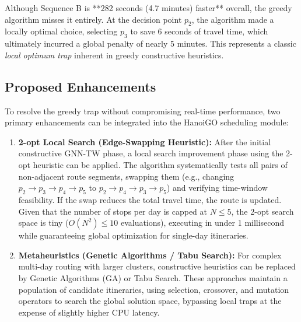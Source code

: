 Although Sequence B is **282 seconds (4.7 minutes) faster** overall, the greedy algorithm misses it entirely. At the decision point $p_2$, the algorithm made a locally optimal choice, selecting $p_3$ to save 6 seconds of travel time, which ultimately incurred a global penalty of nearly 5 minutes. This represents a classic \textit{local optimum trap} inherent in greedy constructive heuristics.

\subsection{Proposed Enhancements}

To resolve the greedy trap without compromising real-time performance, two primary enhancements can be integrated into the HanoiGO scheduling module:

\begin{enumerate}
    \item \textbf{2-opt Local Search (Edge-Swapping Heuristic):} 
    After the initial constructive GNN-TW phase, a local search improvement phase using the 2-opt heuristic can be applied. The algorithm systematically tests all pairs of non-adjacent route segments, swapping them (e.g., changing $p_2 \to p_3 \to p_4 \to p_5$ to $p_2 \to p_4 \to p_3 \to p_5$) and verifying time-window feasibility. If the swap reduces the total travel time, the route is updated. Given that the number of stops per day is capped at $N \le 5$, the 2-opt search space is tiny ($O(N^2) \le 10$ evaluations), executing in under 1 millisecond while guaranteeing global optimization for single-day itineraries.
    
    \item \textbf{Metaheuristics (Genetic Algorithms / Tabu Search):}
    For complex multi-day routing with larger clusters, constructive heuristics can be replaced by Genetic Algorithms (GA) or Tabu Search. These approaches maintain a population of candidate itineraries, using selection, crossover, and mutation operators to search the global solution space, bypassing local traps at the expense of slightly higher CPU latency.
\end{enumerate}
